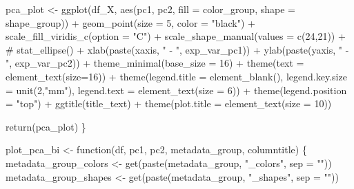 \documentclass[
  letterpaper,
]{book}
\newenvironment{Shaded}{}{}
\newcommand{\AttributeTok}[1]{\textcolor[rgb]{0.84,0.23,0.29}{#1}}
\newcommand{\CommentTok}[1]{\textcolor[rgb]{0.42,0.45,0.49}{#1}}
\newcommand{\ControlFlowTok}[1]{\textcolor[rgb]{0.84,0.23,0.29}{#1}}
\newcommand{\DecValTok}[1]{\textcolor[rgb]{0.00,0.36,0.77}{#1}}
\newcommand{\FunctionTok}[1]{\textcolor[rgb]{0.44,0.26,0.76}{#1}}
\newcommand{\NormalTok}[1]{\textcolor[rgb]{0.14,0.16,0.18}{#1}}
\newcommand{\OtherTok}[1]{\textcolor[rgb]{0.44,0.26,0.76}{#1}}
\newcommand{\SpecialCharTok}[1]{\textcolor[rgb]{0.00,0.36,0.77}{#1}}
\newcommand{\StringTok}[1]{\textcolor[rgb]{0.01,0.18,0.38}{#1}}
\begin{document}
\begin{Shaded}
\begin{Highlighting}[]
\NormalTok{    pca\_plot }\OtherTok{\textless{}{-}} \FunctionTok{ggplot}\NormalTok{(df\_X, }\FunctionTok{aes}\NormalTok{(pc1, pc2, }\AttributeTok{fill =}\NormalTok{ color\_group, }\AttributeTok{shape =}\NormalTok{ shape\_group)) }\SpecialCharTok{+}
     \FunctionTok{geom\_point}\NormalTok{(}\AttributeTok{size =} \DecValTok{5}\NormalTok{, }\AttributeTok{color =} \StringTok{"black"}\NormalTok{) }\SpecialCharTok{+}
     \FunctionTok{scale\_fill\_viridis\_c}\NormalTok{(}\AttributeTok{option =} \StringTok{"C"}\NormalTok{) }\SpecialCharTok{+}
     \FunctionTok{scale\_shape\_manual}\NormalTok{(}\AttributeTok{values =} \FunctionTok{c}\NormalTok{(}\DecValTok{24}\NormalTok{,}\DecValTok{21}\NormalTok{)) }\SpecialCharTok{+}
     \CommentTok{\# stat\_ellipse() +}
     \FunctionTok{xlab}\NormalTok{(}\FunctionTok{paste}\NormalTok{(xaxis, }\StringTok{" {-} "}\NormalTok{, exp\_var\_pc1)) }\SpecialCharTok{+}
     \FunctionTok{ylab}\NormalTok{(}\FunctionTok{paste}\NormalTok{(yaxis, }\StringTok{" {-} "}\NormalTok{, exp\_var\_pc2)) }\SpecialCharTok{+}
     \FunctionTok{theme\_minimal}\NormalTok{(}\AttributeTok{base\_size =} \DecValTok{16}\NormalTok{) }\SpecialCharTok{+}
     \FunctionTok{theme}\NormalTok{(}\AttributeTok{text =} \FunctionTok{element\_text}\NormalTok{(}\AttributeTok{size=}\DecValTok{16}\NormalTok{)) }\SpecialCharTok{+}
     \FunctionTok{theme}\NormalTok{(}\AttributeTok{legend.title =} \FunctionTok{element\_blank}\NormalTok{(),}
           \AttributeTok{legend.key.size =} \FunctionTok{unit}\NormalTok{(}\DecValTok{2}\NormalTok{,}\StringTok{"mm"}\NormalTok{),}
           \AttributeTok{legend.text =} \FunctionTok{element\_text}\NormalTok{(}\AttributeTok{size =} \DecValTok{6}\NormalTok{)) }\SpecialCharTok{+}
     \FunctionTok{theme}\NormalTok{(}\AttributeTok{legend.position =} \StringTok{"top"}\NormalTok{) }\SpecialCharTok{+}
     \FunctionTok{ggtitle}\NormalTok{(title\_text) }\SpecialCharTok{+} \FunctionTok{theme}\NormalTok{(}\AttributeTok{plot.title =} \FunctionTok{element\_text}\NormalTok{(}\AttributeTok{size =} \DecValTok{10}\NormalTok{))}

    \FunctionTok{return}\NormalTok{(pca\_plot)}
\NormalTok{\}}

\NormalTok{plot\_pca\_bi }\OtherTok{\textless{}{-}} \ControlFlowTok{function}\NormalTok{(df, pc1, pc2, metadata\_group, columntitle) \{}
\NormalTok{    metadata\_group\_colors }\OtherTok{\textless{}{-}} \FunctionTok{get}\NormalTok{(}\FunctionTok{paste}\NormalTok{(metadata\_group, }\StringTok{"\_colors"}\NormalTok{, }\AttributeTok{sep =} \StringTok{""}\NormalTok{))}
\NormalTok{    metadata\_group\_shapes }\OtherTok{\textless{}{-}} \FunctionTok{get}\NormalTok{(}\FunctionTok{paste}\NormalTok{(metadata\_group, }\StringTok{"\_shapes"}\NormalTok{, }\AttributeTok{sep =} \StringTok{""}\NormalTok{))}


\end{Highlighting}
\end{Shaded}
\end{document}
